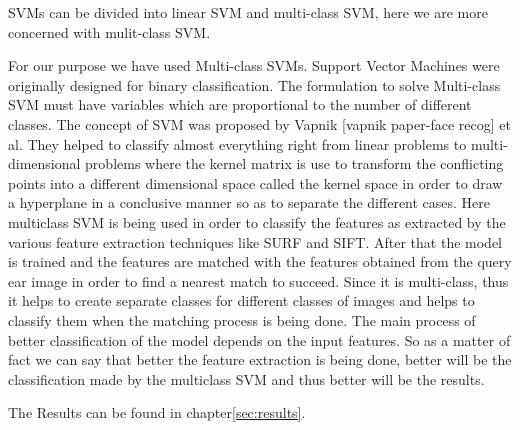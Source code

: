 SVMs can be divided into linear SVM and multi-class SVM, here we are more concerned with mulit-class SVM.

For our purpose we have used Multi-class SVMs. Support Vector Machines were originally designed for binary classification. The formulation to solve Multi-class SVM must have variables which are proportional to the number of different classes. The concept of SVM was proposed by Vapnik [vapnik paper-face recog] et al. They helped to classify almost everything right from linear problems to multi-dimensional problems where the kernel matrix is use to transform the conflicting points into a different dimensional space called the kernel space in order to draw a hyperplane in a conclusive manner so as to separate the different cases. Here multiclass SVM is being used in order to classify the features as extracted by the various feature extraction techniques like SURF and SIFT. After that the model is trained and the features are matched with the features obtained from the query ear image in order to find a nearest match to succeed. Since it is multi-class, thus it helps to create separate classes for different classes of images and helps to classify them when the matching process is being done. The main process of better classification of the model depends on the input features. So as a matter of fact we can say that better the feature extraction is being done, better will be the classification made by the multiclass SVM and thus better will be the results.

The Results can be found in chapter\ref{sec:results}.

